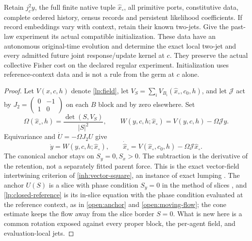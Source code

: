 Retain $j_c^2y$, the full finite native tuple $\widehat x_\circ$, all primitive ports, constitutive data, complete ordered history, census records and persistent likelihood coefficients. If record embeddings vary with context, retain their known two-jets. Give the past-law experiment its actual compatible initialization. These data have an autonomous original-time evolution and determine the exact local two-jet and every admitted future joint response/update kernel at $c$. They preserve the actual collective Fisher cost on the declared regular experiment. Initialization uses reference-context data and is not a rule from the germ at $c$ alone.
\begin{proof}
Let $V(x,c,h)$ denote \cref{lp:field}, let $V_S=\sum_i V_{B_i}(\widehat x_\circ,c_0,h)$, and let $\mathcal J$ act by $J_2=\left(\begin{smallmatrix}0&-1\\1&0\end{smallmatrix}\right)$ on each $B$ block and by zero elsewhere. Set
\begin{equation}
 \Omega(\widehat x_\circ,h)=\frac{\det(S,V_S)}{|S|^2},\qquad
 W(y,c,h;\widehat x_\circ)=V(y,c,h)-\Omega\mathcal Jy.
 \label{lp:omega}
\end{equation}
Equivariance and $\dot U=-\Omega J_2U$ give
\begin{equation}
 \dot y=W(y,c,h;\widehat x_\circ),\qquad
 \dot{\widehat x}_\circ=V(\widehat x_\circ,c_0,h)-\Omega\mathcal J\widehat x_\circ.
 \label{lp:closed-reference}
\end{equation}
The canonical anchor stays on $S_y=0,S_x>0$. The subtraction is the derivative of the retention, not a separately fitted parent force. This is the exact vector-field intertwining criterion of \cref{inh:vector-square}, an instance of exact lumping \citep{HorstmeyerAtay2016}. The anchor $U(S)$ is a slice with phase condition $S_y=0$ in the method of slices \citep{RowleyEtAl2003,BudanurEtAl2015}, and \cref{lp:closed-reference} is its in-slice equation with the phase condition evaluated at the reference context, as in \cref{open:anchor} and \cref{open:moving-flow}; the cone estimate keeps the flow away from the slice border $S=0$. What is new here is a common rotation exposed against every proper block, the per-agent field, and evaluation-local jets.


\end{proof}
